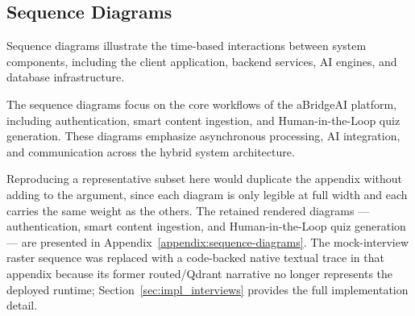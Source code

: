 \subsection{Sequence Diagrams}
\label{sec:sequence-diagrams}

Sequence diagrams illustrate the time-based interactions
between system components, including the client
application, backend services, AI engines,
and database infrastructure.

The sequence diagrams focus on the core workflows
of the aBridgeAI platform, including authentication,
smart content ingestion, and Human-in-the-Loop quiz
generation. These diagrams emphasize asynchronous processing,
AI integration, and communication across the hybrid
system architecture.

Reproducing a representative subset here would duplicate the appendix without
adding to the argument, since each diagram is only legible at full width and
each carries the same weight as the others. The retained rendered diagrams ---
authentication, smart content ingestion, and Human-in-the-Loop quiz generation ---
are presented in Appendix~\ref{appendix:sequence-diagrams}. The mock-interview
raster sequence was replaced with a code-backed native textual trace in that
appendix because its former routed/Qdrant narrative no longer represents the
deployed runtime; Section~\ref{sec:impl_interviews} provides the full implementation detail.
